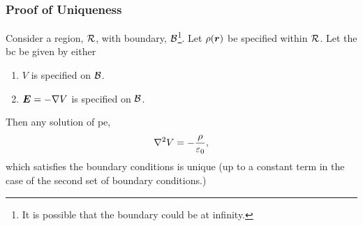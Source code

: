     \subsubsection{Proof of Uniqueness}
    \begin{theorem}
        Consider a region, \(\mathcal{R}\), with boundary, \(\mathcal{B}\)\footnote{It is possible that the boundary could be at infinity.}.
        Let \(\rho(\bm{r})\) be specified within \(\mathcal{R}\).
        Let the \acrshort{bc} be given by either
        \begin{enumerate}
            \item \(V\) is specified on \(\mathcal{B}\).
            \item \(\bm{E} = -\nabla V\) is specified on \(\mathcal{B}\).
        \end{enumerate}
        Then any solution of \acrfull{pe},
        \[\nabla^2 V = -\frac{\rho}{\varepsilon_0},\]
        which satisfies the boundary conditions is unique (up to a constant term in the case of the second set of boundary conditions.)
    \end{theorem}
